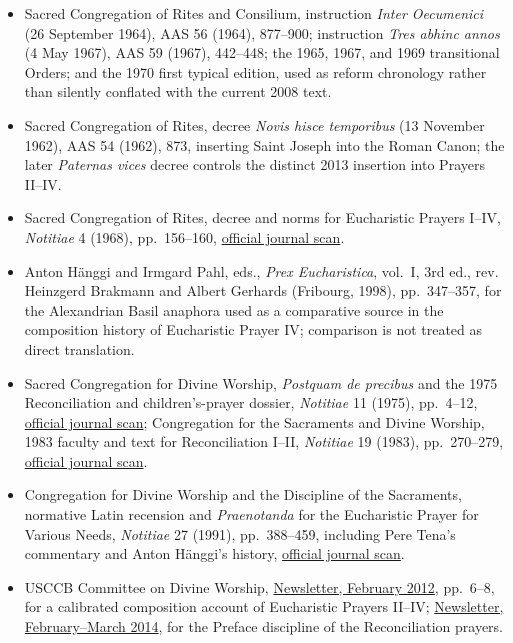 \begin{itemize}[nosep]
  \item Sacred Congregation of Rites and Consilium, instruction \emph{Inter Oecumenici} (26 September 1964), AAS 56 (1964), 877--900; instruction \emph{Tres abhinc annos} (4 May 1967), AAS 59 (1967), 442--448; the 1965, 1967, and 1969 transitional Orders; and the 1970 first typical edition, used as reform chronology rather than silently conflated with the current 2008 text.
  \item Sacred Congregation of Rites, decree \emph{Novis hisce temporibus} (13 November 1962), AAS 54 (1962), 873, inserting Saint Joseph into the Roman Canon; the later \emph{Paternas vices} decree controls the distinct 2013 insertion into Prayers II--IV.
  \item Sacred Congregation of Rites, decree and norms for Eucharistic Prayers I--IV, \emph{Notitiae} 4 (1968), pp.~156--160, \href{https://www.cultodivino.va/content/dam/cultodivino/rivista-notitiae/1960/notitiae-04-\%281968\%29/Notitiae-040-1968.pdf}{official journal scan}.
  \item Anton Hänggi and Irmgard Pahl, eds., \emph{Prex Eucharistica}, vol.~I, 3rd ed., rev. Heinzgerd Brakmann and Albert Gerhards (Fribourg, 1998), pp.~347--357, for the Alexandrian Basil anaphora used as a comparative source in the composition history of Eucharistic Prayer IV; comparison is not treated as direct translation.
  \item Sacred Congregation for Divine Worship, \emph{Postquam de precibus} and the 1975 Reconciliation and children's-prayer dossier, \emph{Notitiae} 11 (1975), pp.~4--12, \href{https://www.cultodivino.va/content/dam/cultodivino/rivista-notitiae/1970/notitiae-11-\%281975\%29/Notitiae-101-1975.pdf}{official journal scan}; Congregation for the Sacraments and Divine Worship, 1983 faculty and text for Reconciliation I--II, \emph{Notitiae} 19 (1983), pp.~270--279, \href{https://www.cultodivino.va/content/dam/cultodivino/rivista-notitiae/1980/notitiae-19-\%281983\%29/Notitiae-202-1983.pdf}{official journal scan}.
  \item Congregation for Divine Worship and the Discipline of the Sacraments, normative Latin recension and \emph{Praenotanda} for the Eucharistic Prayer for Various Needs, \emph{Notitiae} 27 (1991), pp.~388--459, including Pere Tena's commentary and Anton Hänggi's history, \href{https://www.cultodivino.va/content/dam/cultodivino/rivista-notitiae/1990/notitiae-27-\%281991\%29/Notitiae-301-1991.pdf}{official journal scan}.
  \item USCCB Committee on Divine Worship, \href{https://www.usccb.org/resources/newsletter-2012-02.pdf}{Newsletter, February 2012}, pp.~6--8, for a calibrated composition account of Eucharistic Prayers II--IV; \href{https://www.usccb.org/resources/newsletter-2014-02-and-03.pdf}{Newsletter, February--March 2014}, for the Preface discipline of the Reconciliation prayers.
\end{itemize}


